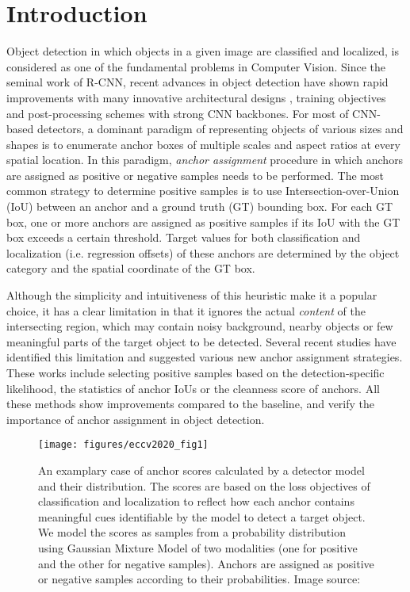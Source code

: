 \documentclass[runningheads]{llncs}
\begin{document}
\section{Introduction}
Object detection in which objects in a given image are classified and localized, is considered as one of the fundamental problems in Computer Vision. Since the seminal work of R-CNN\cite{rcnn}, recent advances in object detection have shown rapid improvements with many innovative architectural designs \cite{fasterrcnn, fpn, refinedet, m2det}, training objectives \cite{fastrcnn, focal, aploss, giou} and post-processing schemes \cite{softnms, learningnms, iounet} with strong CNN backbones\cite{lecun, alexnet, vgg, googlenet, resnet, resnext, deformableconv}. For most of CNN-based detectors, a dominant paradigm of representing objects of various sizes and shapes is to enumerate anchor boxes of multiple scales and aspect ratios at every spatial location. In this paradigm, \textit{anchor assignment} procedure in which anchors are assigned as positive or negative samples needs to be performed. The most common strategy to determine positive samples is to use Intersection-over-Union (IoU) between an anchor and a ground truth (GT) bounding box. For each GT box, one or more anchors are assigned as positive samples if its IoU with the GT box exceeds a certain threshold. Target values for both classification and localization (i.e. regression offsets) of these anchors are determined by the object category and the spatial coordinate of the GT box.

Although the simplicity and intuitiveness of this heuristic make it a popular choice, it has a clear limitation in that it ignores the actual \textit{content} of the intersecting region, which may contain noisy background, nearby objects or few meaningful parts of the target object to be detected. Several recent studies\cite{freeanchor, guidedanchor, atss, mal, noisy} have identified this limitation and suggested various new anchor assignment strategies. These works include  selecting positive samples based on the detection-specific likelihood\cite{freeanchor}, the statistics of anchor IoUs\cite{atss} or the cleanness score of anchors\cite{mal, noisy}. All these methods show improvements compared to the baseline, and verify the importance of anchor assignment in object detection.

\begin{figure}[t]
	\begin{center}
		\texttt{[image: figures/eccv2020\_fig1]}
	\end{center}
	\caption{An examplary case of anchor scores calculated by a detector model and their distribution. The scores are based on the loss objectives of classification and localization to reflect how each anchor contains meaningful cues identifiable by the model to detect a target object. We model the scores as samples from a probability distribution using Gaussian Mixture Model of two modalities (one for positive and the other for negative samples). Anchors are assigned as positive or negative samples according to their probabilities. Image source: \cite{bears}}
	\label{fig1}
\end{figure}
\end{document}
